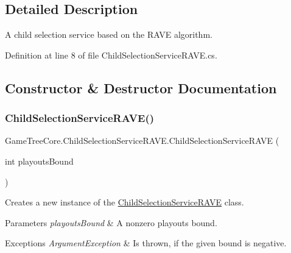 \subsection{Detailed Description}
A child selection service based on the R\+A\+VE algorithm. 



Definition at line 8 of file Child\+Selection\+Service\+R\+A\+V\+E.\+cs.



\subsection{Constructor \& Destructor Documentation}
\mbox{\label{class_game_tree_core_1_1_child_selection_service_r_a_v_e_a45079106ea7e731b606699e6c5123c14}} 
\subsubsection{\texorpdfstring{Child\+Selection\+Service\+R\+A\+V\+E()}{ChildSelectionServiceRAVE()}}
{\footnotesize\ttfamily Game\+Tree\+Core.\+Child\+Selection\+Service\+R\+A\+V\+E.\+Child\+Selection\+Service\+R\+A\+VE (\begin{DoxyParamCaption}\item[{int}]{playouts\+Bound }\end{DoxyParamCaption})}



Creates a new instance of the \mbox{\hyperlink{class_game_tree_core_1_1_child_selection_service_r_a_v_e}{Child\+Selection\+Service\+R\+A\+VE}} class. 


\begin{DoxyParams}{Parameters}
{\em playouts\+Bound} & A nonzero playouts bound.\\
\hline
\end{DoxyParams}

\begin{DoxyExceptions}{Exceptions}
{\em Argument\+Exception} & Is thrown, if the given bound is negative.\\
\hline
\end{DoxyExceptions}


